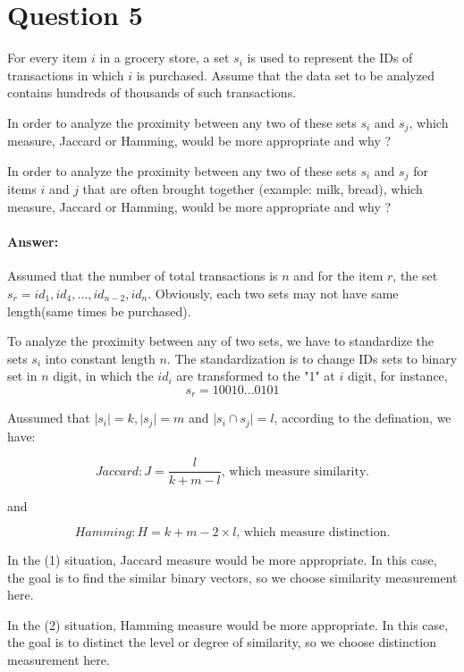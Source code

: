 \documentclass{article}
\begin{document}
\section*{Question 5}{
    For every item \(\mathit{i}\) in a grocery store, a set \(\mathit{s_i}\) is used to represent the IDs of transactions in which \(\mathit{i}\) is purchased. Assume that the data set to be analyzed contains hundreds of thousands of such transactions.
    \begin{enumerate}{
        \item In order to analyze the proximity between any two of these sets \(\mathit{s_i}\) and \(\mathit{s_j}\), which measure, Jaccard or Hamming, would be more appropriate and why ?
        \item In order to analyze the proximity between any two of these sets \(\mathit{s_i}\) and \(\mathit{s_j}\) for items \(\mathit{i}\) and \(\mathit{j}\) that are often brought together (example: milk, bread), which measure, Jaccard or Hamming, would be more appropriate and why ?
    }
    \end{enumerate}

    \paragraph{Answer: }{
        Assumed that the number of total transactions is \(\mathit{n}\) and for the item \(\mathit{r}\), the set \(\mathit{s_r}={id_1, id_4, ..., id_{n-2}, id_n}\). Obviously, each two sets may not have same length(same times be purchased).

        To analyze the proximity between any of two sets, we have to standardize the sets \(\mathit{s_i}\) into constant length $n$. The standardization is to change IDs sets to binary set in \(\mathit{n}\) digit, in which the \(\mathit{id_i}\) are transformed to the "1" at \(\mathit{i}\) digit, for instance, 
        \[\mathit{s_r}=10010...0101\]

        Aussumed that \(\lvert\mathit{s_i}\rvert=k, \lvert\mathit{s_j}\rvert=m\) and \(\lvert\mathit{s_i}\cap\mathit{s_j}\rvert=l\), according to the defination, we have:

        \[Jaccard: \mathit{J}=\frac{l}{k+m-l} \text{, which measure similarity.}\]

        and

        \[Hamming: \mathit{H}=k+m-2\times l \text{, which measure distinction.}\]

        In the (1) situation, Jaccard measure would be more appropriate. In this case, the goal is to find the similar binary vectors, so we choose similarity measurement here.

        In the (2) situation, Hamming measure would be more appropriate. In this case, the goal is to distinct the level or degree of similarity, so we choose distinction measurement here.
    } 
}
\end{document}
